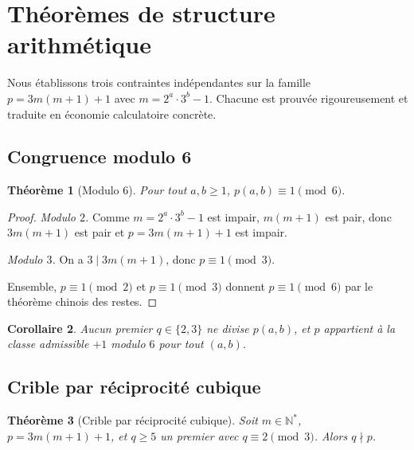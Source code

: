 \documentclass[11pt,a4paper]{article}
\newtheorem{theoreme}{Théorème}[section]
\newtheorem{corollaire}[theoreme]{Corollaire}
\theoremstyle{definition}
\theoremstyle{remark}
\newcommand{\N}{\mathbb{N}}
\begin{document}
\section{Théorèmes de structure arithmétique}\label{sec:filtres}

Nous établissons trois contraintes indépendantes sur la famille
$p = 3m(m+1)+1$ avec $m = 2^a\cdot 3^b-1$. Chacune est prouvée
rigoureusement et traduite en économie calculatoire concrète.

\subsection{Congruence modulo 6}

\begin{rigorousbox}
\begin{theoreme}[Modulo $6$]\label{thm:mod6}
Pour tout $a,b\geq 1$, $p(a,b)\equiv 1\pmod{6}$.
\end{theoreme}
\end{rigorousbox}

\begin{proof}
\textit{Modulo $2$.} Comme $m = 2^a\cdot 3^b-1$ est impair, $m(m+1)$
est pair, donc $3m(m+1)$ est pair et $p = 3m(m+1)+1$ est impair.

\textit{Modulo $3$.} On a $3\mid 3m(m+1)$, donc $p\equiv 1\pmod{3}$.

Ensemble, $p\equiv 1\pmod{2}$ et $p\equiv 1\pmod{3}$ donnent
$p\equiv 1\pmod{6}$ par le théorème chinois des restes.
\end{proof}

\begin{corollaire}
Aucun premier $q\in\{2,3\}$ ne divise $p(a,b)$, et $p$ appartient à la
classe admissible $+1$ modulo $6$ pour tout $(a,b)$.
\end{corollaire}

\subsection{Crible par réciprocité cubique}

\begin{rigorousbox}
\begin{theoreme}[Crible par réciprocité cubique]\label{thm:cubique}
Soit $m\in\N^*$, $p = 3m(m+1)+1$, et $q\geq 5$ un premier avec
$q\equiv 2\pmod{3}$. Alors $q\nmid p$.
\end{theoreme}
\end{rigorousbox}
\end{document}
